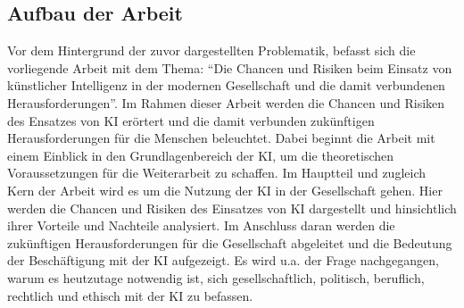 \subsection{Aufbau der Arbeit}
Vor dem Hintergrund der zuvor dargestellten Problematik, befasst sich die vorliegende Arbeit mit dem Thema: \enquote{Die Chancen und Risiken beim Einsatz von künstlicher Intelligenz in der modernen Gesellschaft und die damit verbundenen Herausforderungen}.
Im Rahmen dieser Arbeit werden die Chancen und Risiken des Ensatzes von \ac{KI} erörtert und die damit verbunden zukünftigen Herausforderungen für die Menschen beleuchtet.
Dabei beginnt die Arbeit mit einem Einblick in den Grundlagenbereich der \ac{KI}, um die theoretischen Voraussetzungen für die Weiterarbeit zu schaffen.
Im Hauptteil und zugleich Kern der Arbeit wird es um die Nutzung der \ac{KI} in der Gesellschaft gehen. Hier werden die Chancen und Risiken des Einsatzes von \ac{KI} dargestellt und
hinsichtlich ihrer Vorteile und Nachteile analysiert. Im Anschluss daran werden die zukünftigen Herausforderungen für die Gesellschaft abgeleitet und die Bedeutung der Beschäftigung mit der KI aufgezeigt. Es wird u.a. der Frage nachgegangen, 
warum es heutzutage notwendig ist, sich gesellschaftlich, politisch, beruflich, rechtlich und ethisch mit der KI zu befassen. 
   